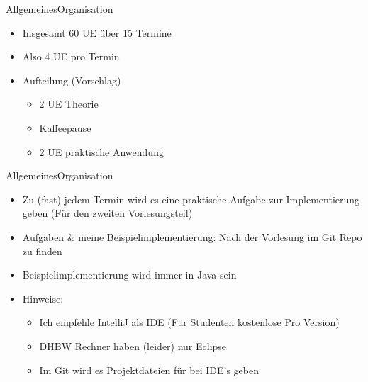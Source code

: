 \begin{frame}{Allgemeines}{Organisation}
	\begin{itemize}
		\item Insgesamt 60 UE über 15 Termine
		\item Also 4 UE pro Termin
		\item Aufteilung (Vorschlag)
		\begin{itemize}
			\item 2 UE Theorie
			\item Kaffeepause
			\item 2 UE praktische Anwendung
		\end{itemize}
	\end{itemize}
\end{frame}

\begin{frame}{Allgemeines}{Organisation}
	\begin{itemize}
		\item Zu (fast) jedem Termin wird es eine praktische Aufgabe zur Implementierung geben (Für den zweiten Vorlesungsteil)
		\item Aufgaben \& meine Beispielimplementierung: Nach der Vorlesung im Git Repo zu finden
		\item Beispielimplementierung wird immer in Java sein
		\item Hinweise:
		\begin{itemize}
			\item Ich empfehle IntelliJ als IDE (Für Studenten kostenlose Pro Version)
			\item DHBW Rechner haben (leider) nur Eclipse
			\item Im Git wird es Projektdateien für bei IDE's geben
		\end{itemize}
	\end{itemize}
\end{frame}

